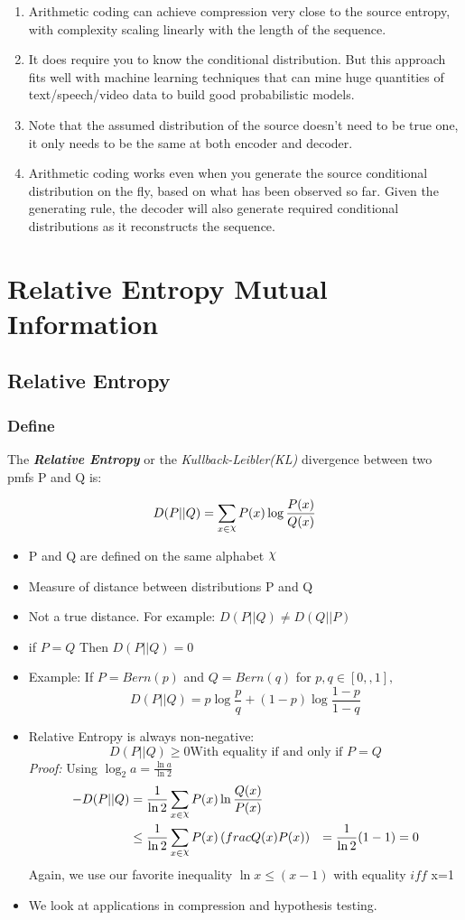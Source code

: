 \documentclass[24pt]{article}
\DeclareRobustCommand{\rchi}{{\mathpalette\irchi\relax}}
\newcommand{\irchi}[2]{\raisebox{\depth}{$#1\chi$}} %
\begin{document}
\begin{enumerate}
\item Arithmetic coding can achieve compression very close to the source entropy, with complexity scaling linearly with the length of the sequence.
\item It does require you to know the conditional distribution. But this approach fits well with machine learning techniques that can mine huge quantities of text/speech/video data to build good probabilistic models.
\item Note that the assumed distribution of the source doesn't need to be true one, it only needs to be the same at both encoder and decoder.
\item Arithmetic coding works even when you generate the source conditional distribution on the fly, based on what has been observed so far. Given the generating rule, the decoder will also generate required conditional distributions as it reconstructs the sequence.
\end{enumerate}

\section{Relative Entropy Mutual Information}
\subsection{Relative Entropy}
\subsubsection{Define}
The \textbf{\textit{Relative Entropy}} or the \textit{Kullback-Leibler(KL)} divergence between two pmfs P and Q is:

\[
D(P||Q) = \sum_{x \in \rchi}P(x)\log\frac{P(x)}{Q(x)}
\]

\begin{itemize}
\item P and Q are defined on the same alphabet $\rchi$
\item Measure of distance between distributions  P and Q
\item Not a true distance. For example:  $D(P||Q) \not = D(Q||P)$
\item if $P=Q$ Then $D(P||Q) = 0$
\item Example: If $P= Bern(p) $ and $Q= Bern(q)$ for $p,q \in [0,,1],$
\[
D(P||Q) = p\log\frac{p}{q} + (1-p)\log\frac{1-p}{1-q}
\] 
\item Relative Entropy is always non-negative:
\[
D(P||Q) \ge 0 \textrm{With equality if and only if } P=Q
\]
\textit{Proof:} Using $\log_2a = \frac{\ln a}{\ln 2}$
\begin{align*}
-D(P||Q) & = \frac{1}{\ln 2} \sum_{x \in \rchi} P(x) \ln\frac{Q(x)}{P(x)} \\
& \le  \frac{1}{\ln 2} \sum_{x \in \rchi} P(x)\left( frac{Q(x)}{P(x)}\right) 
& = \frac{1}{\ln 2} (1-1) = 0
\end{align*}
Again, we use our favorite inequality $\ln x \le (x-1)$ with equality $iff$  x=1
\item We look at applications in \textcolor{blue1}{compression} and \textcolor{blue1}{hypothesis testing}.
\end{itemize}
\end{document}
